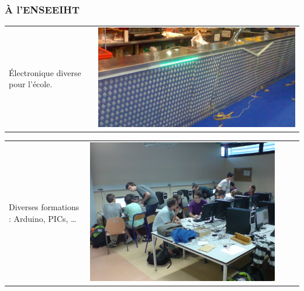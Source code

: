\documentclass[9pt]{beamer}
\begin{document}
\begin{frame}
	\frametitle{À l'ENSEEIHT}
	

	\begin{tabular}{ l l }
		\begin{minipage}[c]{.4\linewidth}
			Électronique diverse pour l'école.
		\end{minipage} &  
		\begin{minipage}[c]{.6\linewidth}
			\includegraphics[width=.9\textwidth]{bar}
		\end{minipage}\\
	\end{tabular}
	
	\begin{tabular}{ l l }
		\begin{minipage}[c]{.4\linewidth}
			Diverses formations : Arduino, PICs, \ldots
		\end{minipage} &  
		\begin{minipage}[c]{.6\linewidth}
			\includegraphics[width=0.9\textwidth]{formation}
		\end{minipage}\\
	\end{tabular}
	

		
		
		

	
\end{frame}
\end{document}
